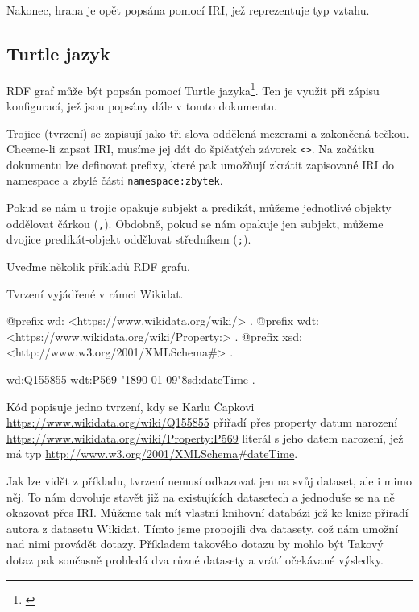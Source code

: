 Nakonec, hrana je opět popsána pomocí IRI, jež reprezentuje typ vztahu.

\subsection{Turtle jazyk}
RDF graf může být popsán pomocí Turtle jazyka\footnote{\citet{Prud'hommeaux:14:RT}}. Ten je využit při zápisu konfigurací, jež jsou popsány dále v tomto dokumentu.

Trojice (tvrzení) se zapisují jako tři slova oddělená mezerami a zakončená tečkou. Chceme-li zapsat IRI, musíme jej dát do špičatých závorek \texttt{<>}. Na začátku dokumentu lze definovat prefixy, které pak umožňují zkrátit zapisované IRI do namespace a zbylé části \texttt{namespace:zbytek}.

Pokud se nám u trojic opakuje subjekt a predikát, můžeme jednotlivé objekty oddělovat čárkou (\texttt{,}). Obdobně, pokud se nám opakuje jen subjekt, můžeme dvojice predikát-objekt oddělovat středníkem (\texttt{;}).

\newpage

Uveďme několik příkladů RDF grafu.

\begin{prikl}
Tvrzení  vyjádřené v rámci Wikidat.
\begin{code}
@prefix wd: <https://www.wikidata.org/wiki/> .
@prefix wdt: <https://www.wikidata.org/wiki/Property:> .
@prefix xsd: <http://www.w3.org/2001/XMLSchema#> .

wd:Q155855 wdt:P569 "1890-01-09"^^xsd:dateTime .
\end{code}

Kód popisuje jedno tvrzení, kdy se Karlu Čapkovi \\ \url{https://www.wikidata.org/wiki/Q155855} přiřadí přes property datum narození \url{https://www.wikidata.org/wiki/Property:P569} literál s jeho datem narození, jež má typ \url{http://www.w3.org/2001/XMLSchema#dateTime}.
\end{prikl}

Jak lze vidět z příkladu, tvrzení nemusí odkazovat jen na svůj dataset, ale i mimo něj. To nám dovoluje stavět již na existujících datasetech a jednoduše se na ně okazovat přes IRI. Můžeme tak mít vlastní knihovní databázi jež ke knize přiradí autora z datasetu Wikidat. Tímto jsme propojili dva datasety, což nám umožní nad nimi provádět dotazy. Příkladem takového dotazu by mohlo být  Takový dotaz pak současně prohledá dva různé datasety a vrátí očekávané výsledky.

